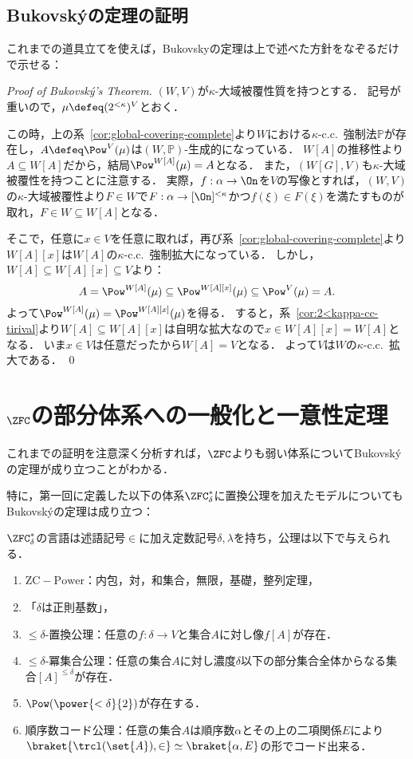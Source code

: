\documentclass[a4j,leqno]{ltjsarticle}
\newcommand{\cc}{c.c.\ }
\begin{document}
\subsection{Bukovsk\'{y}の定理の証明}
これまでの道具立てを使えば，Bukovskyの定理は上で述べた方針をなぞるだけで示せる：
\begin{proof}[Proof of Bukovsk\'{y}'s Theorem]
 $(W, V)$が$\kappa$-大域被覆性質を持つとする．
 記号が重いので，$\mu \defeq (2^{<\kappa})^V$とおく．

 この時，上の系~\ref{cor:global-covering-complete}より$W$における$\kappa$-\cc{}強制法$\mathbb{P}$が存在し，$A \defeq \Pow^V(\mu)$は$(W, \mathbb{P})$-生成的になっている．
 $W[A]$の推移性より$A \subseteq W[A]$だから，結局$\Pow^{W[A]}(\mu) = A$となる．
 また，$(W[G], V)$も$\kappa$-大域被覆性を持つことに注意する．
 実際，$f: \alpha \to \On$を$V$の写像とすれば，$(W, V)$の$\kappa$-大域被覆性より$F \in W$で$F: \alpha \to [\On]^{<\kappa}$かつ$f(\xi) \in F(\xi)$を満たすものが取れ，$F \in W \subseteq W[A]$となる．

 そこで，任意に$x \in V$を任意に取れば，再び系~\ref{cor:global-covering-complete}より$W[A][x]$は$W[A]$の$\kappa$-\cc{}強制拡大になっている．
 しかし，$W[A] \subseteq W[A][x] \subseteq V$より：
 \[
 A = \Pow^{W[A]}(\mu) \subseteq \Pow^{W[A][x]}(\mu)  \subseteq \Pow^V(\mu) = A.
 \]
 よって$\Pow^{W[A]}(\mu) = \Pow^{W[A][x]}(\mu)$を得る．
 すると，系~\ref{cor:2<kappa-cc-tirival}より$W[A] \subseteq W[A][x]$は自明な拡大なので$x \in W[A][x] = W[A]$となる．
 いま$x \in V$は任意だったから$W[A] = V$となる．
 よって$V$は$W$の$\kappa$-\cc{}拡大である． \qed
\end{proof}

\section{$\ZFC$の部分体系への一般化と一意性定理}
これまでの証明を注意深く分析すれば，$\ZFC$よりも弱い体系についてBukovsk\'{y}の定理が成り立つことがわかる．

特に，第一回に定義した以下の体系$\ZFC_\delta^*$に置換公理を加えたモデルについてもBukovsk\'{y}の定理は成り立つ：
\begin{definition}[$\ZFC_\delta^*$]
 $\ZFC_\delta^*$の言語は述語記号$\in$に加え定数記号$\delta, \lambda$を持ち，公理は以下で与えられる．
 \begin{enumerate}
  \item $\mathrm{ZC}-\mathrm{Power}$：内包，対，和集合，無限，基礎，整列定理，
  \item 「$\delta$は正則基数」，
  \item ${\leq}\delta$-置換公理：任意の$f: \delta \to V$と集合$A$に対し像$f[A]$が存在．
  \item ${\leq}\delta$-冪集合公理：任意の集合$A$に対し濃度$\delta$以下の部分集合全体からなる集合$[A]^{\leq\delta}$が存在．
  \item $\Pow(\power{<\delta}{2})$が存在する．
  \item 順序数コード公理：任意の集合$A$は順序数$\alpha$とその上の二項関係$E$により$\braket{\trcl(\set{A}), {\in}} \simeq \braket{\alpha, E}$の形でコード出来る．
 \end{enumerate}
\end{definition}
\end{document}
